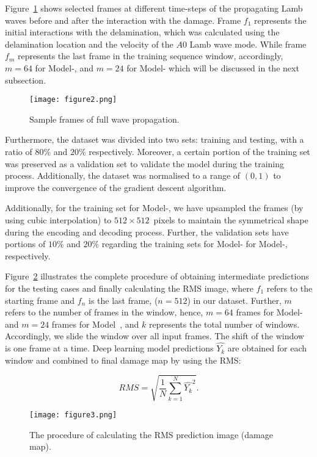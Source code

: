 Figure~\ref{fig:Full_wave} shows selected frames at different time-steps of the propagating Lamb waves before and after the interaction with the damage.
Frame \(f_{1}\) represents the initial interactions with the delamination, which was calculated using the delamination location and the velocity of the \(A0\) Lamb wave mode.
While frame \(f_{m}\) represents the last frame in the training sequence window, accordingly, \(m=64\) for Model-, and \(m=24\) for Model- which will be discussed in the next subsection.
\begin{figure}[!h]
	\centering
	\texttt{[image: figure2.png]}
	\caption{Sample frames of full wave propagation.}
	\label{fig:Full_wave}
\end{figure}

Furthermore, the dataset was divided into two sets: training and testing, with 
a ratio of \(80\%\) and \(20\% \) respectively.
Moreover, a certain portion of the training set was preserved as a validation set to validate the model during the training process.
Additionally, the dataset was normalised to a range of \((0, 1)\) to improve the convergence of the gradient descent algorithm.


Additionally, for the training set for Model-, we have upsampled the 
frames (by using cubic interpolation) to \(512\times512\)~pixels to maintain 
the symmetrical shape during the encoding and decoding process.
Further, the validation sets have portions of \(10\%\) and \(20\%\) regarding the training sets for Model- for Model-, respectively.

Figure~\ref{fig:Diagram_exp_predictions} illustrates the complete procedure of obtaining intermediate predictions for the testing cases and finally calculating the RMS image, where \(f_{1}\) refers to the starting frame and \(f_{n}\) is the last frame, (\(n=512\)) in our dataset.
Further, \(m\) refers to the number of frames in the window, hence, \(m=64\) frames for Model- and \(m=24\) frames for Model~, and \(k\) represents the total number of windows.
Accordingly, we slide the window over all input frames.
The shift of the window is one frame at a time.
Deep learning model predictions \(\hat{Y_k}\) are obtained for each window and combined to final damage map by using the RMS:

\begin{equation}
	RMS = \sqrt{\frac{1}{N}\sum_{k=1}^{N}\hat{Y_k}^2}.	
	\label{RMS}
\end{equation}
\begin{figure}[!h]
	\centering
	\texttt{[image: figure3.png]}
	\caption{The procedure of calculating the RMS prediction image (damage map).}
	\label{fig:Diagram_exp_predictions}
\end{figure}
